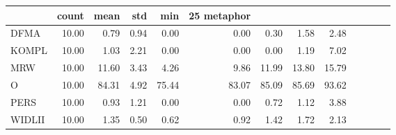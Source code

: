 \begin{tabular}{lrrrrrrrr}
\toprule
 & count & mean & std & min & 25%
metaphor &  &  &  &  &  &  &  &  \\
\midrule
DFMA & 10.00 & 0.79 & 0.94 & 0.00 & 0.00 & 0.30 & 1.58 & 2.48 \\
KOMPL & 10.00 & 1.03 & 2.21 & 0.00 & 0.00 & 0.00 & 1.19 & 7.02 \\
MRW & 10.00 & 11.60 & 3.43 & 4.26 & 9.86 & 11.99 & 13.80 & 15.79 \\
O & 10.00 & 84.31 & 4.92 & 75.44 & 83.07 & 85.09 & 85.69 & 93.62 \\
PERS & 10.00 & 0.93 & 1.21 & 0.00 & 0.00 & 0.72 & 1.12 & 3.88 \\
WIDLII & 10.00 & 1.35 & 0.50 & 0.62 & 0.92 & 1.42 & 1.72 & 2.13 \\
\bottomrule
\end{tabular}
